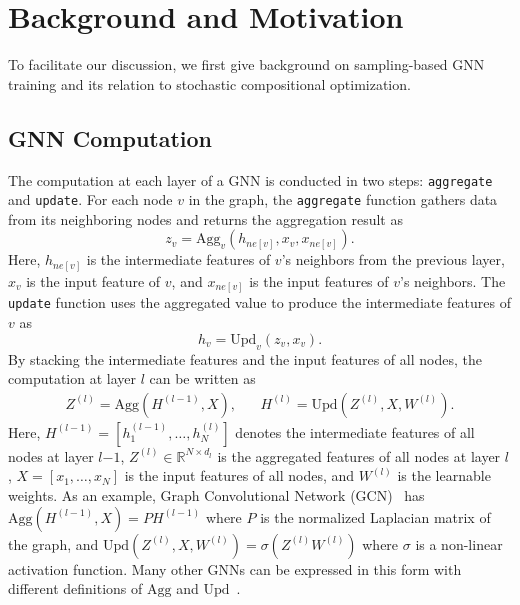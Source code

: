 \section{Background and Motivation}
To facilitate our discussion, we first give background on sampling-based GNN training and its relation to stochastic compositional optimization. 

\subsection{GNN Computation}
The computation at each layer of a GNN is conducted in two steps: {\tt aggregate} and {\tt update}. 
For each node $v$ in the graph, the  {\tt aggregate} function gathers data from its neighboring nodes and returns the aggregation result as 
\begin{equation}
    z_v = \mathrm{Agg}_v(h_{ne[v]}, x_v, x_{ne[v]}). 
\end{equation}
Here, $h_{ne[v]}$ is the intermediate features of $v$'s neighbors from the previous layer, $x_v$ is the input feature of $v$, and $x_{ne[v]}$ is the input features of $v$'s neighbors. 
The {\tt update} function uses the aggregated value to produce the intermediate features of $v$ as 
\begin{equation}
    h_v = \mathrm{Upd}_v(z_v, x_v). 
\end{equation}
By stacking the intermediate features and the input features of all nodes, the computation at layer $l$ can be written as 
\begin{equation}
\label{eq:agg_upd}
\begin{split}
Z^{(l)}=\mathrm{Agg}(H^{(l-1)}, X), \;\;\;\;\;\;
H^{(l)} = \mathrm{Upd}(Z^{(l)}, X, W^{(l)}).
\end{split}
\end{equation}
Here, $H^{(l-1)}=[h^{(l-1)}_1,\ldots, h^{(l)}_N]$ denotes the intermediate features of all nodes at layer $l$$-$$1$, $Z^{(l)}\in \mathbb{R}^{N\times d_l}$ is the aggregated features of all nodes at layer $l$, $X = [x_1,\ldots,x_N]$ is the input features of all nodes, and $ W^{(l)}$ is the learnable weights. 
As an example, Graph Convolutional Network (GCN)~\cite{kipf2017semi} has $\mathrm{Agg}(H^{(l-1)}, X)=PH^{(l-1)}$ where $P$ is the normalized Laplacian matrix of the graph, and $\mathrm{Upd}(Z^{(l)}, X,  W^{(l)})=\sigma(Z^{(l)} W^{(l)})$ where $\sigma$ is a non-linear activation function.   
Many other GNNs can be expressed in this form with different definitions of $\mathrm{Agg}$ and $\mathrm{Upd}$~\cite{zhou2018graph}. 






